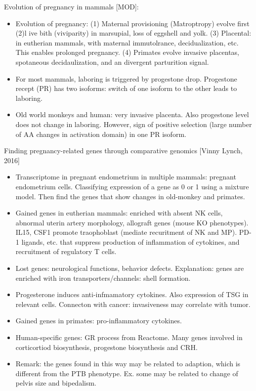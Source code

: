 \documentclass{report}
\begin{document}
Evolution of pregnancy in mammals [MOD]: 
\begin{itemize}
	\item Evolution of pregnancy: (1) Maternal provisioning (Matroptropy) evolve first (2)l ive bith (viviparity) in marsupial, loss of eggshell and yolk. (3) Placental: in eutherian mammals, with maternal immutolrance, decidualization, etc. This enables prolonged pregnancy. (4) Primates evolve invasive placentas, spotaneous decidaulization, and an divergent parturition signal.
	
	\item For most mammals, laboring is triggered by progestone drop. Progestone recept (PR) has two isoforms: switch of one isoform to the other leads to laboring. 
	
	\item Old world monkeys and human: very invasive placenta. Also progestone level does not change in laboring. However, sign of positive selection (large number of AA changes in activation domain) in one PR isoform. 
\end{itemize}

Finding pregnancy-related genes through comparative genomics [Vinny Lynch, 2016]
\begin{itemize}
	\item Transcriptome in pregnant endometrium in multiple mammals: pregnant endometrium cells. Classifying expression of a gene as 0 or 1 using a mixture model. Then find the genes that show changes in old-monkey and primates. 
	
	\item Gained genes in eutherian mammals: enriched with absent NK cells, abnormal uterin artery morphology, allograft genes (mouse KO phenotypes). IL15, CSF1 promote traophoblast (mediate recuritment of NK and MP). PD-1 ligands, etc. that suppress production of inflammation of cytokines, and recruitment of regulatory T cells.
	
	\item Lost genes: neurological functions, behavior defects. Explanation: genes are enriched with iron transporters/channels: shell formation.
		
	\item Progesterone induces anti-infmamatory cytokines. Also expression of TSG in relevant cells. Connecton with cancer: invasiveness may correlate with tumor.
	
	\item Gained genes in primates: pro-inflammatory cytokines.
	
	\item Human-specific genes: GR process from Reactome. Many genes involved in corticortiod biosynthesis, progestone biosynthesis and CRH.
	
	\item Remark: the genes found in this way may be related to adaption, which is different from the PTB phenotype. Ex. some may be related to change of pelvis size and bipedalism.  
\end{itemize}
\end{document}
